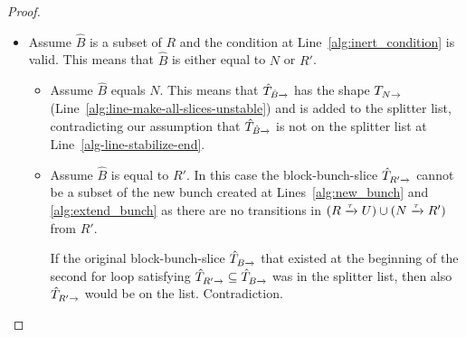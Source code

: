 \documentclass[a4paper,10pt]{article}
\theoremstyle{definition}
\theoremstyle{plain}
\newcommand{\pijl}[1]{\mathrel{\text{$\xrightarrow{\smash[t]{#1}}$}}}
\begin{document}
\begin{proof}
\begin{itemize}
\begin{itemize}
	\end{itemize}
\item
	Assume $\hat{B}$ is a subset of $R$ and the condition at Line~\ref{alg:inert_condition} is valid.
	This means that $\hat{B}$ is either equal to $N$ or $R'$.
	\begin{itemize}
	\item	Assume $\hat{B}$ equals $N$.
		This means that $\hat{T}_{\smash[t]{\hat{B}}\pijl{}}$ has the shape $T_{N\pijl{}}$ (Line~\ref{alg:line-make-all-slices-unstable})
		and is added to the splitter list,
		contradicting our assumption
		that $\hat{T}_{\smash[t]{\hat{B}}\pijl{}}$ is not on the splitter list at Line~\ref{alg-line-stabilize-end}.
	\item	Assume $\hat{B}$ is equal to $R'$.
		In this case the block-bunch-slice $\hat{T}_{R'\pijl{}}$ cannot be a subset of the new bunch
		created at Lines~\ref{alg:new_bunch} and \ref{alg:extend_bunch}
		as there are no transitions in $\mbox{$(R\pijl{\tau}U)$} \cup \mbox{$(N \pijl{\tau} R')$}$ from $R'$.

		If the original block-bunch-slice $\hat{T}_{B\pijl{}}$
		that existed at the beginning of the second for loop satisfying $\hat{T}_{R'\pijl{}}\subseteq \hat{T}_{B\pijl{}}$
		was in the splitter list,
		then also $\hat{T}_{R'\pijl{}}$ would be on the list.
		Contradiction.


\end{itemize}
\end{itemize}
\end{proof}
\end{document}
